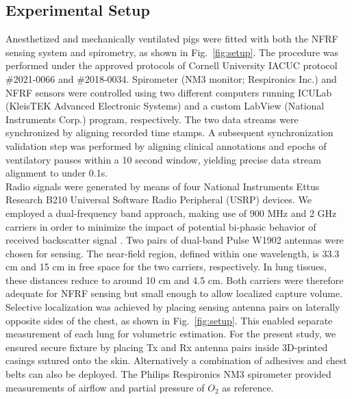 \documentclass[journal,twoside,web]{ieeecolor}
\begin{document}
\subsection{Experimental Setup}
Anesthetized and mechanically ventilated pigs were fitted with both the NFRF sensing system and spirometry, as shown in Fig.~\ref{fig:setup}. The procedure was performed under the approved protocols of Cornell University IACUC protocol \#2021-0066 and \#2018-0034. Spirometer (NM3 monitor; Respironics Inc.) and NFRF sensors were controlled using two different computers running ICULab (KleisTEK Advanced Electronic Systems) and a custom LabView (National Instruments Corp.) program, respectively. The two data streams were synchronized by aligning recorded time stamps. A subsequent synchronization validation step was performed by aligning clinical annotations and epochs of ventilatory pauses within a 10 second window, yielding precise data stream alignment to under 0.1s.\\
Radio signals were generated by means of four National Instruments Ettus Research B210 Universal Software Radio Peripheral (USRP) devices. We employed a dual-frequency band approach, making use of 900 MHz and 2 GHz carriers in order to minimize the impact of potential bi-phasic behavior of received backscatter signal \cite{zhouBackscatterFieldModel2023}. Two pairs of dual-band Pulse W1902 antennas were chosen for sensing. The near-field region, defined within one wavelength, is 33.3 cm and 15 cm in free space for the two carriers, respectively. In lung tissues, these distances reduce to around 10 cm and 4.5 cm. Both carriers were therefore adequate for NFRF sensing but small enough to allow localized capture volume. Selective localization was achieved by placing sensing antenna pairs on laterally opposite sides of the chest, as shown in Fig.~\ref{fig:setup}. This enabled separate measurement of each lung for volumetric estimation. For the present study, we ensured secure fixture by placing Tx and Rx antenna pairs inside 3D-printed casings sutured onto the skin. Alternatively a combination of adhesives and chest belts can also be deployed. The Philips Respironics NM3 spirometer provided measurements of airflow and partial pressure of $O_{2}$ as reference. 
\end{document}
